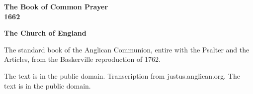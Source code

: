 \documentclass[11pt,letterpaper]{article}
\begin{document}
\color{ink}

\begin{titlepage}
\centering
\vspace*{4em}
{\LARGE\bfseries\color{heading} The Book of Common Prayer\\[0.3em]1662\par}
\vspace{2em}
{\Large\bfseries\color{heading} The Church of England\par}
\vspace{2.5em}
{\itshape\color{subhead}\parbox{0.8\linewidth}{\centering The standard book of the Anglican Communion, entire with the Psalter and the Articles, from the Baskerville reproduction of 1762.\par}}
\vfill
{\small The text is in the public domain. Transcription from justus.anglican.org. The text is in the public domain.\par}
\vspace{2em}
\end{titlepage}

\tableofcontents


\end{document}
